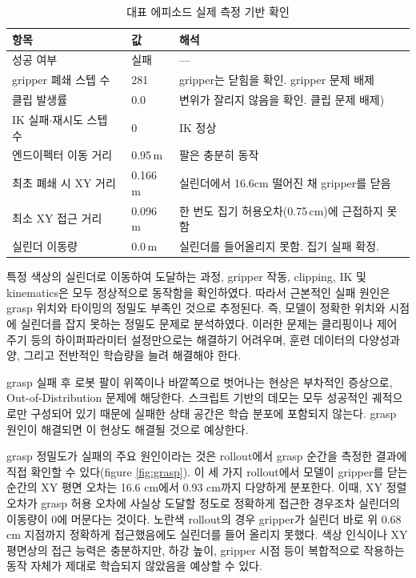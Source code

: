\documentclass[11pt,a4paper]{article}
\begin{document}
\begin{table}[h]
\centering
\caption{대표 에피소드 실제 측정 기반 확인}
\label{tab:diag}
\small
\begin{tabularx}{\linewidth}{@{}L{4.7cm} L{2.7cm} Y@{}}
\toprule
항목 & 값 & 해석 \\
\midrule
성공 여부 & 실패 & --- \\
gripper 폐쇄 스텝 수 & 281 & gripper는 닫힘을 확인. gripper 문제 배제 \\
클립 발생률 & 0.0 & 변위가 잘리지 않음을 확인. 클립 문제 배제) \\
IK 실패$\cdot$재시도 스텝 수 & 0 & IK 정상 \\
엔드이펙터 이동 거리 & 0.95\,m & 팔은 충분히 동작 \\
최초 폐쇄 시 XY 거리 & 0.166\,m & 실린더에서 16.6cm 떨어진 채 gripper를 닫음 \\
최소 XY 접근 거리 & 0.096\,m & 한 번도 집기 허용오차(0.75\,cm)에 근접하지 못함 \\
실린더 이동량 & 0.0\,m & 실린더를 들어올리지 못함. 집기 실패 확정. \\
\bottomrule
\end{tabularx}
\end{table}

특정 색상의 실린더로 이동하여 도달하는 과정, gripper 작동, clipping, IK 및 kinematics은 모두 정상적으로 동작함을 확인하였다.
따라서 근본적인 실패 원인은 grasp 위치와 타이밍의 정밀도 부족인 것으로 추정된다.
즉, 모델이 정확한 위치와 시점에 실린더를 잡지 못하는 정밀도 문제로 분석하였다.
이러한 문제는 클리핑이나 제어 주기 등의 하이퍼파라미터 설정만으로는 해결하기 어려우며,
훈련 데이터의 다양성과 양, 그리고 전반적인 학습량을 늘려 해결해야 한다.

grasp 실패 후 로봇 팔이 위쪽이나 바깥쪽으로 벗어나는 현상은 부차적인 증상으로,
Out-of-Distribution 문제에 해당한다. 스크립트 기반의 데모는 모두 성공적인 궤적으로만 구성되어 있기 때문에 실패한 상태
공간은 학습 분포에 포함되지 않는다. grasp 원인이 해결되면 이 현상도 해결될 것으로 예상한다.

grasp 정밀도가 실패의 주요 원인이라는 것은 rollout에서 grasp 순간을
측정한 결과에 직접 확인할 수 있다(figure \ref{fig:grasp}).
이 세 가지 rollout에서 모델이 gripper를 닫는 순간의 XY 평면 오차는
16.6 cm에서 0.93 cm까지 다양하게 분포한다. 이때, XY 정렬 오차가 grasp 허용 오차에 사실상
도달할 정도로 정확하게 접근한 경우조차 실린더의 이동량이 0에 머문다는 것이다.
노란색 rollout의 경우 gripper가 실린더 바로 위 0.68 cm 지점까지 정확하게 접근했음에도
실린더를 들어 올리지 못했다. 색상 인식이나 XY 평면상의 접근 능력은 충분하지만,
하강 높이, gripper 시점 등이 복합적으로 작용하는 동작 자체가 제대로 학습되지 않았음을 예상할 수 있다.
\end{document}
